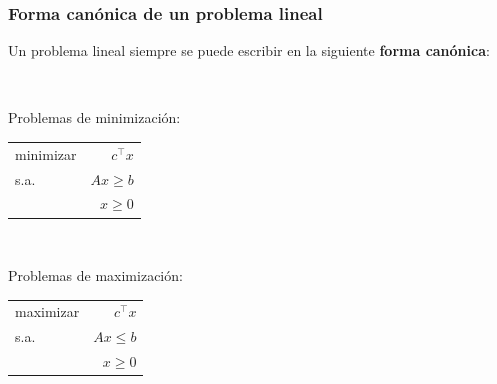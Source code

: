 \documentclass{beamer}
\begin{document}
\begin{frame}
\frametitle{Forma canónica de un problema lineal}

Un problema lineal siempre se puede escribir en la siguiente \textbf{forma canónica}:

\

Problemas de minimización:


\begin{center}
\begin{tabular}{lr}
minimizar & $c^\top x$ \\
s.a. & $Ax \geq b$   \\
	 & $x\geq 0$
\end{tabular}
\end{center}


\
 
Problemas de maximización:


\begin{center}
\begin{tabular}{lr}
maximizar & $c^\top x$ \\
s.a. & $Ax \leq b$   \\
	 & $x\geq 0$
\end{tabular}
\end{center}

\end{frame}
\end{document}
